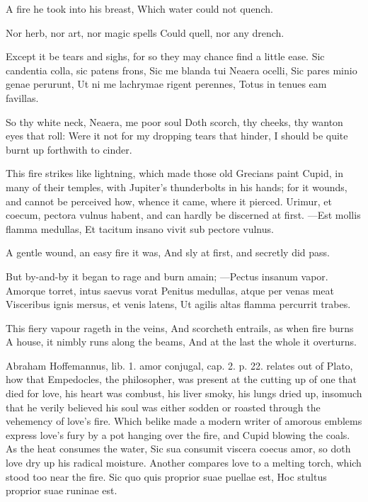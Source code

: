 {A fire he took into his breast,
Which water could not quench.

Nor herb, nor art, nor magic spells
Could quell, nor any drench.

Except it be tears and sighs, for so they may chance find a little
ease.
Sic candentia colla, sic patens frons,
Sic me blanda tui Neaera ocelli,
Sic pares minio genae perurunt,
Ut ni me lachrymae rigent perennes,
Totus in tenues eam favillas.

So thy white neck, Neaera, me poor soul
Doth scorch, thy cheeks, thy wanton eyes that roll:
Were it not for my dropping tears that hinder,
I should be quite burnt up forthwith to cinder.

This fire strikes like lightning, which made those old Grecians paint
Cupid, in many of their temples, with Jupiter's thunderbolts in
his hands; for it wounds, and cannot be perceived how, whence it came,
where it pierced. Urimur, et coecum, pectora vulnus habent, and
can hardly be discerned at first.
---Est mollis flamma medullas,
Et tacitum insano vivit sub pectore vulnus.

A gentle wound, an easy fire it was,
And sly at first, and secretly did pass.

But by-and-by it began to rage and burn amain;
---Pectus insanum vapor.
Amorque torret, intus saevus vorat
Penitus medullas, atque per venas meat
Visceribus ignis mersus, et venis latens,
Ut agilis altas flamma percurrit trabes.

This fiery vapour rageth in the veins,
And scorcheth entrails, as when fire burns
A house, it nimbly runs along the beams,
And at the last the whole it overturns.

Abraham Hoffemannus, lib. 1. amor conjugal, cap. 2. p. 22. relates out
of Plato, how that Empedocles, the philosopher, was present at the
cutting up of one that died for love, his heart was combust, his
liver smoky, his lungs dried up, insomuch that he verily believed his
soul was either sodden or roasted through the vehemency of love's fire.
Which belike made a modern writer of amorous emblems express love's
fury by a pot hanging over the fire, and Cupid blowing the coals. As
the heat consumes the water, Sic sua consumit viscera coecus
amor, so doth love dry up his radical moisture. Another compares love
to a melting torch, which stood too near the fire.
Sic quo quis proprior suae puellae est,
Hoc stultus proprior suae runinae est.

}
